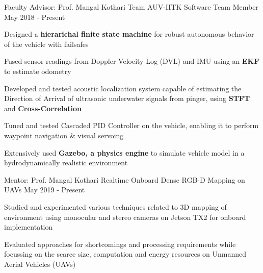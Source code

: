 
\begin{cventries}

 \cventry
    {Faculty Advisor: Prof. Mangal Kothari}
    {Team AUV-IITK}
    {Software Team Member}
    {May 2018 - Present}
    {
      \begin{cvitems}
        \item{Designed a \textbf{hierarichal finite state machine} for robust autonomous behavior of the vehicle with failsafes}
        \item{Fused sensor readings from Doppler Velocity Log (DVL) and IMU using an \textbf{EKF} to estimate odometry}
        
        \item{Developed and tested acoustic localization system capable of estimating the Direction of Arrival of ultrasonic underwater signals from pinger, using \textbf{STFT} and \textbf{Cross-Correlation}}
        \item{Tuned and tested Cascaded PID Controller on the vehicle, enabling it to perform waypoint navigation \& visual servoing}
        \item{Extensively used \textbf{Gazebo, a physics engine} to simulate vehicle model in a hydrodynamically realistic environment}
      \end{cvitems}
    }
  
   \cventry
    {Mentor: Prof. Mangal Kothari}
    {Realtime Onboard Dense RGB-D Mapping on UAVs}
    {}
    {May 2019 - Present}
    {
      \begin{cvitems}
        \item {Studied and experimented various techniques related to 3D mapping of environment using monocular and stereo cameras on Jetson TX2 for onboard implementation}
        \item {Evaluated approaches for shortcomings and processing requirements while focussing on the scarce size, computation and energy resources on Unmanned Aerial Vehicles (UAVs)}
      \end{cvitems}
    }


\end{cventries}
